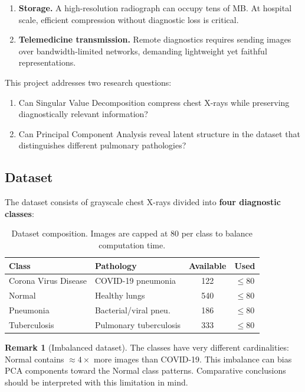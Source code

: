 \documentclass[11pt,a4paper]{article}
\theoremstyle{definition}
\newtheorem{remark}{Remark}
\begin{document}
\begin{enumerate}[nosep]
  \item \textbf{Storage.} A high-resolution radiograph can occupy tens of MB.
        At hospital scale, efficient compression without diagnostic loss is critical.
  \item \textbf{Telemedicine transmission.} Remote diagnostics requires sending
        images over bandwidth-limited networks, demanding lightweight yet
        faithful representations.
\end{enumerate}

This project addresses two research questions:

\begin{enumerate}[nosep]
  \item Can Singular Value Decomposition compress chest X-rays while preserving
        diagnostically relevant information?
  \item Can Principal Component Analysis reveal latent structure in the dataset
        that distinguishes different pulmonary pathologies?
\end{enumerate}

\subsection{Dataset}

The dataset consists of grayscale chest X-rays divided into \textbf{four
diagnostic classes}:

\begin{table}[H]
\centering
\begin{tabularx}{0.9\textwidth}{llcc}
\toprule
\textbf{Class} & \textbf{Pathology} & \textbf{Available} & \textbf{Used} \\
\midrule
Corona Virus Disease & COVID-19 pneumonia    & 122 & $\leq 80$ \\
Normal               & Healthy lungs         & 540 & $\leq 80$ \\
Pneumonia            & Bacterial/viral pneu. & 186 & $\leq 80$ \\
Tuberculosis         & Pulmonary tuberculosis& 333 & $\leq 80$ \\
\bottomrule
\end{tabularx}
\caption{Dataset composition. Images are capped at 80 per class to balance computation time.}
\end{table}

\begin{remark}[Imbalanced dataset]
  The classes have very different cardinalities: Normal contains $\approx 4\times$
  more images than COVID-19. This imbalance can bias PCA components toward the
  Normal class patterns. Comparative conclusions should be interpreted with this
  limitation in mind.
\end{remark}
\end{document}
